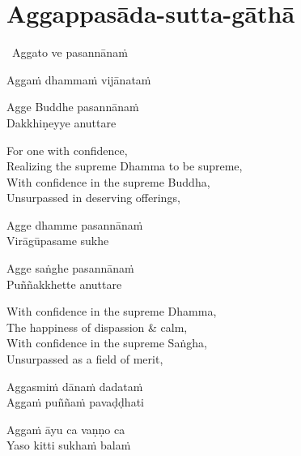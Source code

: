 \suttaRef{[MJG]}

\section{Aggappasāda-sutta-gāthā}
\label{aggappasada-sutta-gatha}

\begin{leader-only}
  \anglebracketleft\ \hspace{-0.5mm}Aggato ve pasannānaṁ \hspace{-0.5mm}\anglebracketright\
\end{leader-only}

\vspace{-0.99em}

\begin{pali-hang}
  Aggaṁ dhammaṁ vijānataṁ
\end{pali-hang}
\begin{pali-hangtogether}
  Agge Buddhe pasannānaṁ\\
  Dakkhiṇeyye anuttare
\end{pali-hangtogether}

\begin{english-verses}
  For one with confidence,\\
  Realizing the supreme Dhamma to be supreme,\\
  With confidence in the supreme Buddha,\\
  Unsurpassed in deserving offerings,
\end{english-verses}

\begin{pali-hang}
  Agge dhamme pasannānaṁ\\
  Virāgūpasame sukhe
\end{pali-hang}
\begin{pali-hangtogether}
  Agge saṅghe pasannānaṁ\\
  Puññakkhette anuttare
\end{pali-hangtogether}

\begin{english-verses}
  With confidence in the supreme Dhamma,\\
  The happiness of dispassion \& calm,\\
  With confidence in the supreme Saṅgha,\\
  Unsurpassed as a field of merit,
\end{english-verses}

\begin{pali-hang}
  Aggasmiṁ dānaṁ dadataṁ\\
  Aggaṁ puññaṁ pavaḍḍhati
\end{pali-hang}
\begin{pali-hangtogether}
  Aggaṁ āyu ca vaṇṇo ca\\
  Yaso kitti sukhaṁ balaṁ
\end{pali-hangtogether}

